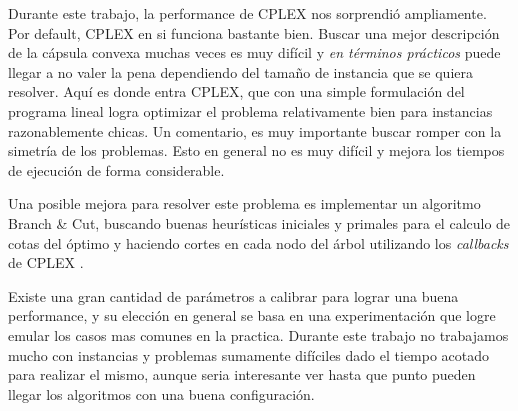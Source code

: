 Durante este trabajo, la performance de CPLEX nos sorprendió ampliamente. Por default, CPLEX en si funciona bastante bien. Buscar una mejor descripción de la cápsula convexa muchas veces es muy difícil y \textit{en términos prácticos} puede llegar a no valer la pena dependiendo del tamaño de instancia que se quiera resolver. Aquí es donde entra CPLEX, que con una simple formulación del programa lineal logra optimizar el problema relativamente bien para instancias razonablemente chicas. Un comentario, es muy importante buscar romper con la simetría de los problemas. Esto en general no es muy difícil y mejora los tiempos de ejecución de forma considerable.

Una posible mejora para resolver este problema es implementar un algoritmo Branch \& Cut, buscando buenas heurísticas iniciales y primales para el calculo de cotas del óptimo y haciendo cortes en cada nodo del árbol utilizando los \textit{callbacks} de CPLEX \cite{cplex}.

Existe una gran cantidad de parámetros a calibrar para lograr una buena performance, y su elección en general se basa en una experimentación que logre emular los casos mas comunes en la practica. Durante este trabajo no trabajamos mucho con instancias y problemas sumamente difíciles dado el tiempo acotado para realizar el mismo, aunque seria interesante ver hasta que punto pueden llegar los algoritmos con una buena configuración.